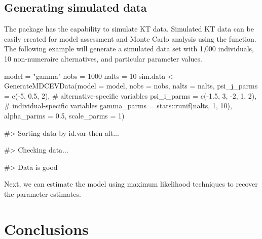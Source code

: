 \hypertarget{generating-simulated-data}{%
\subsection{Generating simulated data}\label{generating-simulated-data}}

The  package has the capability to simulate KT data.
Simulated KT data can be easily created for model assessment and Monte
Carlo analysis using the  function. The
following example will generate a simulated data set with 1,000
individuals, 10 non-numeraire alternatives, and particular parameter
values.

\begin{Schunk}
\begin{Sinput}
model = "gamma" 
nobs = 1000
nalts = 10
sim.data <- GenerateMDCEVData(model = model, 
                              nobs = nobs, 
                              nalts = nalts,
                              psi_j_parms = c(-5, 0.5, 2), # alternative-specific variables
                              psi_i_parms = c(-1.5, 3, -2, 1, 2), # individual-specific variables
                              gamma_parms = stats::runif(nalts, 1, 10),
                              alpha_parms = 0.5,
                              scale_parms = 1)
\end{Sinput}
\begin{Soutput}
#> Sorting data by id.var then alt...
\end{Soutput}
\begin{Soutput}
#> Checking data...
\end{Soutput}
\begin{Soutput}
#> Data is good
\end{Soutput}
\end{Schunk}

Next, we can estimate the model using maximum likelihood techniques to
recover the parameter estimates.

\begin{Schunk}
\end{Schunk}

\hypertarget{conclusions}{%
\section{Conclusions}\label{conclusions}}

